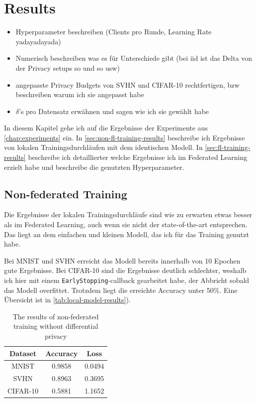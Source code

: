 \chapter{Results}\label{chap:results}
\begin{itemize}
	\item Hyperparameter beschreiben (Clients pro Runde, Learning Rate yadayadayada)
	\item Numerisch beschreiben was es für Unterschiede gibt (bei iid ist das Delta von der Privacy setups so und so usw)
	\item angepasste Privacy Budgets von SVHN und CIFAR-10 rechtfertigen, bzw beschreiben warum ich sie angepasst habe
	\item $\delta$'s pro Datensatz erwähnen und sagen wie ich sie gewählt habe
\end{itemize}

In diesem Kapitel gehe ich auf die Ergebnisse der Experimente aus \autoref{chap:experiments} ein. In \autoref{sec:non-fl-training-results} beschreibe ich Ergebnisse von lokalen Trainingsdurchläufen mit dem identischen Modell. In \autoref{sec:fl-training-results} beschreibe ich detaillierter welche Ergebnisse ich im Federated Learning erzielt habe und beschreibe die genutzten Hyperparameter.

\section{Non-federated Training} \label{sec:non-fl-training-results}
Die Ergebnisse der lokalen Trainingsdurchläufe sind wie zu erwarten etwas besser als im Federated Learning, auch wenn sie nicht der state-of-the-art entsprechen. Das liegt an dem einfachen und kleinen Modell, das ich für das Training genutzt habe.

Bei MNIST und SVHN erreicht das Modell bereits innerhalb von 10 Epochen gute Ergebnisse. Bei CIFAR-10 sind die Ergebnisse deutlich schlechter, weshalb ich hier mit einem \texttt{EarlyStopping}-callback gearbeitet habe, der Abbricht sobald das Modell overfittet. Trotzdem liegt die erreichte Accuracy unter 50\%. Eine Übersicht ist in \autoref{tab:local-model-results}).

\begin{table}
	\centering
	\begin{tabular}{|c|c|c|}
		\hline
		Dataset & Accuracy & Loss \\
		\hline
		MNIST & 0.9858 & 0.0494 \\
		SVHN & 0.8963 & 0.3695 \\
		CIFAR-10 & 0.5881 & 1.1652 \\
		\hline
	\end{tabular}
	\caption{The results of non-federated training without differential privacy}
	\label{tab:local-model-results}
\end{table}

